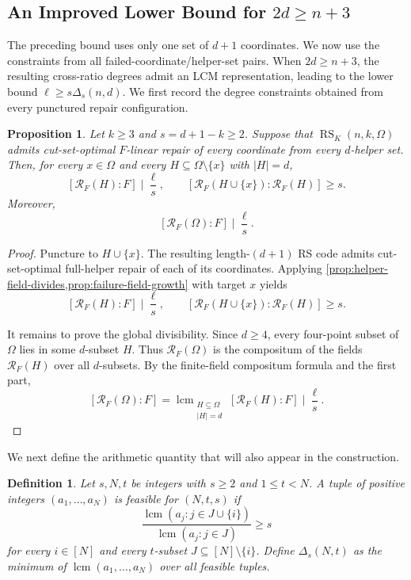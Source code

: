 \documentclass[11pt,onecolumn]{IEEEtran}
\newtheorem{definition}{Definition}
\newtheorem{proposition}{Proposition}
\newcommand{\lcmop}{\operatorname{lcm}}
\newcommand{\RS}{\operatorname{RS}}
\newcommand{\crf}{\mathscr R}
\begin{document}
\subsection{An Improved Lower Bound for \texorpdfstring{$2d\geq n+3$}{2d >= n+3}}
\label{subsec:two-d-lower}

The preceding bound uses only one set of $d+1$ coordinates.  We now use
the constraints from all failed-coordinate/helper-set pairs.  When
$2d\geq n+3$, the resulting cross-ratio degrees admit an LCM
representation, leading to the lower bound $\ell\ge s\Delta_s(n,d)$.
We first record the degree constraints obtained from every punctured
repair configuration.

\begin{proposition}
\label{prop:global-crossratio}
Let $k\ge3$ and $s=d+1-k\ge2$. Suppose that
$\RS_K(n,k,\Omega)$ admits cut-set-optimal $F$-linear repair of every
coordinate from every $d$-helper set. Then, for every $x\in\Omega$ and
every $H\subseteq\Omega\setminus\{x\}$ with $|H|=d$,
\[
[\crf_F(H):F]\mid\frac{\ell}{s},
\qquad
[\crf_F(H\cup\{x\}):\crf_F(H)]\ge s.
\]
Moreover,
\[
[\crf_F(\Omega):F]\mid\frac{\ell}{s}.
\]
\end{proposition}

\begin{proof}
Puncture to $H\cup\{x\}$.  The resulting length-$(d+1)$ RS code admits
cut-set-optimal full-helper repair of each of its coordinates.  Applying
\cref{prop:helper-field-divides,prop:failure-field-growth} with target
$x$ yields
\[
[\crf_F(H):F]\mid\frac{\ell}{s},
\qquad
[\crf_F(H\cup\{x\}):\crf_F(H)]\ge s.
\]

It remains to prove the global divisibility. Since $d\ge4$,
every four-point subset of $\Omega$ lies in some $d$-subset $H$.
Thus $\crf_F(\Omega)$ is the compositum of the fields
$\crf_F(H)$ over all $d$-subsets. By the finite-field
compositum formula and the first part,
\[
[\crf_F(\Omega):F]
=\lcmop_{\substack{H\subseteq\Omega\\ |H|=d}}
[\crf_F(H):F]
\mid\frac{\ell}{s}.
\]
\end{proof}

We next define the arithmetic quantity that will also appear in the
construction.

\begin{definition}
\label{def:Delta}
Let $s,N,t$ be integers with $s\ge2$ and $1\le t<N$. A tuple of positive integers
$(a_1,\ldots,a_N)$ is \emph{feasible for $(N,t,s)$} if
\[
\frac{\lcmop(a_j:j\in J\cup\{i\})}
     {\lcmop(a_j:j\in J)}\ge s
\]
for every $i\in[N]$ and every $t$-subset
$J\subseteq[N]\setminus\{i\}$.  Define $\Delta_s(N,t)$ as the minimum
of $\lcmop(a_1,\ldots,a_N)$ over all feasible tuples.
\end{definition}
\end{document}
